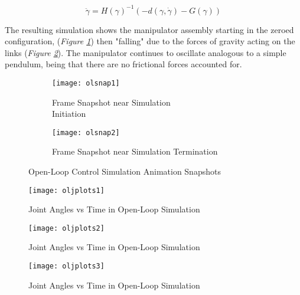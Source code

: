 \begin{equation}
\ddot{\gamma}=H(\gamma)^{-1}(-d(\gamma, \dot{\gamma})-G(\gamma))
\label{eq:eoms2}
\end{equation}

The resulting simulation shows the manipulator assembly starting in the zeroed configuration, (\emph{Figure \ref{fig:olsnap1}}) then "falling" due to the forces of gravity acting on the links (\emph{Figure \ref{fig:olsnap2}}). The manipulator continues to oscillate analogous to a simple pendulum, being that there are no frictional forces accounted for.

\begin{figure}[htp]
  \center
  \begin{subfigure}[c]{0.5\textwidth}
  \center
  \texttt{[image: olsnap1]}
  \caption{Frame Snapshot near Simulation \\Initiation}
  \label{fig:olsnap1}
\end{subfigure}%
\begin{subfigure}[c]{0.5\textwidth}
  \center
  \texttt{[image: olsnap2]}
  \caption{Frame Snapshot near Simulation Termination}
  \label{fig:olsnap2}
\end{subfigure}
  \caption{Open-Loop Control Simulation Animation Snapshots}
  \label{fig:olsnaps}
\end{figure}

\begin{figure}[htp]
  \center
  \texttt{[image: oljplots1]}
  \caption{Joint Angles vs Time in Open-Loop Simulation}
  \label{fig:oljplots1}
\end{figure}
\begin{figure}[htp]
  \center
  \texttt{[image: oljplots2]}
  \caption{Joint Angles vs Time in Open-Loop Simulation}
  \label{fig:oljplots2}
\end{figure}
\begin{figure}[htp]
  \center
  \texttt{[image: oljplots3]}
  \caption{Joint Angles vs Time in Open-Loop Simulation}
  \label{fig:oljplots3}
\end{figure}

\newpage
